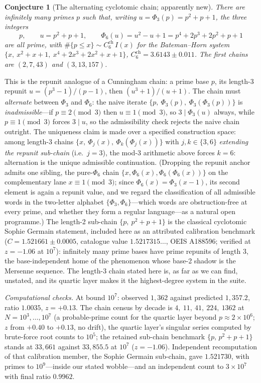 \documentclass[11pt]{article}
\newtheorem{conjecture}{Conjecture}
\theoremstyle{definition}
\begin{document}
\setcounter{conjecture}{23}%
\begin{conjecture}[The alternating cyclotomic chain; apparently
new]\label{c6}
There are infinitely many primes $p$ such that, writing
$u=\Phi_3(p)=p^2+p+1$, the three integers
\[
p,\qquad u=p^2+p+1,\qquad
\Phi_6(u)=u^2-u+1=p^4+2p^3+2p^2+p+1
\]
are all prime, with
$\#\{p\le x\}\sim C_6^{\mathrm{ch}}\,I(x)$ for the Bateman--Horn
system $\{x,\ x^2+x+1,\ x^4+2x^3+2x^2+x+1\}$,
$C_6^{\mathrm{ch}}=3.6143\pm0.011$.  The first chains are
$(2,7,43)$ and $(3,13,157)$.
\end{conjecture}

This is the repunit analogue of a Cunningham chain: a prime base $p$,
its length-3 repunit $u=(p^3-1)/(p-1)$, then $(u^3+1)/(u+1)$.  The
chain must \emph{alternate} between $\Phi_3$ and $\Phi_6$: the naive
iterate $\{p,\ \Phi_3(p),\ \Phi_3(\Phi_3(p))\}$ is
\emph{inadmissible}---if $p\equiv2\pmod3$ then $u\equiv1\pmod3$, so
$3\mid\Phi_3(u)$ always, while $p\equiv1\pmod 3$ forces $3\mid u$, so
the admissibility check rejects the naive chain outright.
The uniqueness claim is made over a specified construction space:
among length-3 chains
$\{x,\ \Phi_j(x),\ \Phi_k(\Phi_j(x))\}$ with $j,k\in\{3,6\}$
\emph{extending the repunit sub-chain} (i.e.\ $j=3$), the
mod-3 arithmetic above forces $k=6$: alternation is the unique
admissible continuation.  (Dropping the repunit anchor admits one
sibling, the pure-$\Phi_6$ chain $\{x,\Phi_6(x),\Phi_6(\Phi_6(x))\}$
on the complementary lane $x\equiv1\pmod3$; since
$\Phi_6(x)=\Phi_3(x-1)$, its second element is again a repunit value,
and we regard the classification of all admissible words in the
two-letter alphabet $\{\Phi_3,\Phi_6\}$---which words are
obstruction-free at every prime, and whether they form a regular
language---as a natural open programme.)  The length-2 sub-chain
$\{p,\ p^2+p+1\}$ is the classical cyclotomic Sophie Germain
statement, included here as an attributed calibration benchmark
($C=1.521661\pm0.0005$, catalogue value $1.5217315\ldots$,
OEIS A188596; verified at $z=-1.06$ at $10^7$): infinitely many prime bases
have prime
repunits of length $3$, the base-independent home of the phenomenon
whose base-2 shadow is the Mersenne sequence.  The length-3 chain
stated here is, as far as we can find, unstated, and its quartic layer
makes it the highest-degree system in the suite.

\emph{Computational checks.}  At bound $10^{7}$: observed $1{,}362$ against
predicted $1{,}357.2$, ratio $1.0035$, $z=+0.13$.  The chain census by
decade is $4,\ 11,\ 41,\ 224,\ 1362$ at $N=10^3,\dots,10^7$ (a
probable-prime count for the quartic layer beyond
$p\approx2\times10^6$; $z$ from $+0.40$ to $+0.13$, no drift), the
quartic layer's singular series computed by brute-force root counts to
$10^5$; the retained sub-chain benchmark $\{p,\,p^2+p+1\}$ stands at
$33{,}661$ against $33{,}855.5$ at $10^7$ ($z=-1.06$).  Independent
recomputation of that calibration member, the Sophie Germain
sub-chain, gave $1.521730$, with primes to $10^9$---inside our stated
wobble---and an independent count to $3\times10^7$ with final ratio
$0.9962$.
\end{document}
